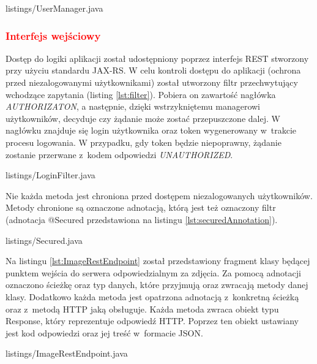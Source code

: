 
{listings/UserManager.java}

\subsubsection{\textcolor{red}{Interfejs wejściowy}}
Dostęp do logiki aplikacji został udostępniony poprzez interfejs REST stworzony
przy użyciu standardu JAX-RS. W celu kontroli dostępu do aplikacji
(ochrona przed niezalogowanymi użytkownikami) został utworzony filtr przechwytujący wchodzące zapytania (listing \ref{lst:filter}). 
Pobiera on zawartość nagłówka \textit{AUTHORIZATON}, a następnie, dzięki wstrzykniętemu managerowi użytkowników, decyduje czy żądanie może zostać przepuszczone dalej. W nagłówku znajduje się login użytkownika oraz token wygenerowany w~trakcie procesu logowania. W przypadku, gdy token będzie niepoprawny, żądanie zostanie przerwane z~kodem odpowiedzi \textit{UNAUTHORIZED}.


{listings/LoginFilter.java}

Nie każda metoda jest chroniona przed dostępem niezalogowanych użytkowników. Metody chronione są oznaczone adnotacją, którą jest też oznaczony filtr (adnotacja @Secured przedstawiona na listingu \ref{lst:securedAnnotation}).


{listings/Secured.java}

Na listingu \ref{lst:ImageRestEndpoint} został przedstawiony fragment klasy będącej punktem wejścia do serwera odpowiedzialnym za zdjęcia. Za pomocą adnotacji oznaczono ścieżkę oraz typ danych, które przyjmują oraz zwracają metody danej klasy. Dodatkowo każda metoda jest opatrzona adnotacją z~konkretną ścieżką oraz z~metodą HTTP jaką obsługuje. Każda metoda zwraca obiekt typu Response, który reprezentuje odpowiedź HTTP. Poprzez ten obiekt ustawiany jest kod odpowiedzi oraz jej treść w~formacie JSON.


{listings/ImageRestEndpoint.java}

